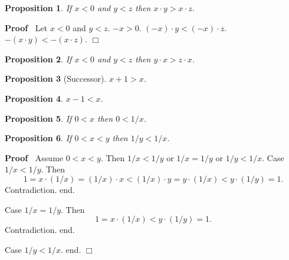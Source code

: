 \documentclass{article}
\newenvironment{forthel}{\begin{leftbar}}{\end{leftbar}}
\newenvironment{proof}{\noindent\textbf{Proof\ }}{\hspace*{\fill}$\Box$\medskip}
\newtheorem{proposition}{Proposition}
\begin{document}
\begin{forthel}
\begin{proposition} If $x < 0$ and $y < z$ then 
$x \cdot y > x \cdot z$.\end{proposition}
\begin{proof} Let $x < 0$ and $y < z$.
$-x > 0$.
$(-x)\cdot y < (-x)\cdot z$.
$-(x\cdot y) < -(x\cdot z)$.
\end{proof}

\begin{proposition} If $x < 0$ and $y < z$ then 
$y \cdot x > z \cdot x$.\end{proposition}

\begin{proposition}[Successor] $x + 1 > x$.\end{proposition}
\begin{proposition} $x - 1 < x$. \end{proposition}


\begin{proposition} If $0 < x$ then $0 < 1/x$.
\end{proposition}

\begin{proposition} If $0 < x < y$ then $1/y < 1/x$.
\end{proposition}
\begin{proof}
Assume $0 < x < y$.
Then $1/x < 1/y$ or $1/x = 1/y$ or $1/y < 1/x$.
Case $1/x < 1/y$. Then
$$1 = x \cdot (1/x) = (1/x) \cdot x < (1/x) \cdot y = 
y \cdot (1/x) < y \cdot (1/y) = 1.$$ 
Contradiction. end.

Case $1/x = 1/y$. Then
$$1 = x \cdot (1/x) < y \cdot (1/y) = 1.$$ 
Contradiction. end.

Case $1/y < 1/x$. end.
\end{proof}

\end{forthel}
\end{document}

